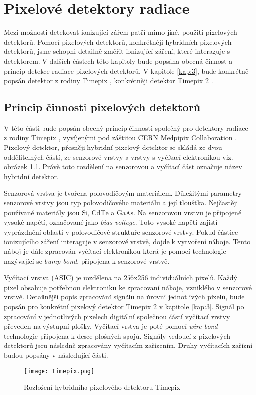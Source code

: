 \chapter{Pixelové detektory radiace}
\label{kap:2}
Mezi možnosti detekovat ionizující záření patří mimo jiné, použití pixelových detektorů. Pomocí pixelových detektorů, konkrétněji hybridních pixelových detektorů, jsme schopni detailně změřit ionizující záření, které interaguje s detektorem. V dalších částech této kapitoly bude popsána obecná činnost a princip detekce radiace pixelových detektorů. V kapitole \ref{kap:3}, bude konkrétně popsán detektor z rodiny Timepix \cite{Llopart}, konkrétněji detektor Timepix 2 \cite{tpx2_manual}. 


\section{Princip činnosti pixelových detektorů}
\label{kap:2.1}
V této části bude popsán obecný princip činnosti společný pro detektory radiace z rodiny Timepix \cite{Llopart}, vyvíjenými pod záštitou CERN Medpipix Collaboration \cite{Medpix}. Pixelový detektor, přesněji hybridní pixelový detektor se skládá ze dvou oddělitelných částí, ze senzorové vrstvy a vrstvy s vyčítací elektronikou viz. obrázek \ref{fig:Timepix}. Právě toto rozdělení na senzorovou a vyčítací část označuje název hybridní detektor.
\par Senzorová vrstva je tvořena polovodičovým materiálem. Důležitými parametry senzorové vrstvy jsou typ polovodičového materiálu a její tloušťka. Nejčastěji používané materiály jsou $\text{Si}$, $\text{CdTe}$ a $\text{GaAs}$. %
Na senzorovou vrstvu je připojené vysoké napětí, označované jako \textit{bias voltage}. Toto vysoké napětí zajistí vyprázdnění oblasti v polovodičové struktuře senzorové vrstvy. Pokud částice ionizujícího záření interaguje v senzorové vrstvě, dojde k vytvoření náboje. Tento náboj je dále zpracován vyčítací elektronikou která je pomocí technologie nazývající se \textit{bump bond}, připojena k senzorové vrstvě.
\par Vyčítací vrstva (ASIC) je rozdělena na 256x256 individuálních pixelů. Každý pixel obsahuje potřebnou elektroniku ke zpracovaní náboje, vzniklého v senzorové vrstvě. Detailnější popis zpracování signálu na úrovni jednotlivých pixelů, bude popsán pro konkrétní pixelový detektor Timepix 2 v kapitole \ref{kap:3}. Signál po zpracování v jednotlivých pixelech digitální společnou částí vyčítací vrstvy převeden na výstupní plošky. Vyčítací vrstva je poté pomocí \textit{wire bond} technologie připojena k desce plošných spojů. Signály vedoucí z pixelových detektorů jsou následně zpracovány vyčítacím zařízením. Druhy vyčítacích zařízní budou popsány v následující části.
 \begin{figure}[h!]
 	\centering
 	\captionsetup{justification=centering}
 	\texttt{[image: Timepix.png]}
 	\caption{Rozložení hybridního pixelového detektoru Timepix \cite{Platkevic}} 
 	\label{fig:Timepix}
 \end{figure}	

